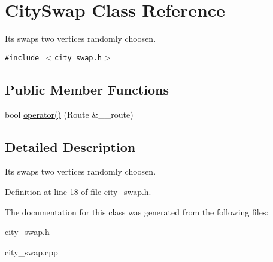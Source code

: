\hypertarget{classCitySwap}{
\section{City\-Swap Class Reference}
\label{classCitySwap}
}
Its swaps two vertices randomly choosen.  


{\tt \#include $<$city\_\-swap.h$>$}

\subsection*{Public Member Functions}
\begin{CompactItemize}
\item 
\hypertarget{classCitySwap_7e6958b62048c89604cbf046b86bdf2d}{
bool \hyperlink{classCitySwap_7e6958b62048c89604cbf046b86bdf2d}{operator()} (Route \&\_\-\_\-route)}
\label{classCitySwap_7e6958b62048c89604cbf046b86bdf2d}

\end{CompactItemize}


\subsection{Detailed Description}
Its swaps two vertices randomly choosen. 



Definition at line 18 of file city\_\-swap.h.

The documentation for this class was generated from the following files:\begin{CompactItemize}
\item 
city\_\-swap.h\item 
city\_\-swap.cpp\end{CompactItemize}
